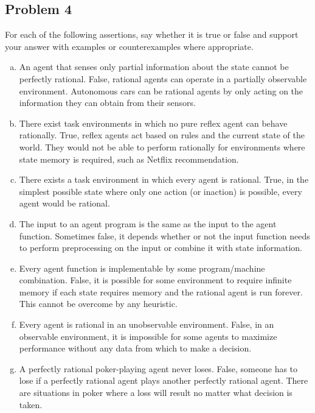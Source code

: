 \documentclass{math}
\begin{document}
\subsection*{Problem 4}
For each of the following assertions, say whether it is true or false and
support your answer with examples or counterexamples where appropriate.
\begin{enumerate}[(a)]
  \item An agent that senses only partial information about the state cannot be
  perfectly rational. False, rational agents can operate in a partially
  observable environment. Autonomous cars can be rational agents by only acting
  on the information they can obtain from their sensors.
  \item There exist task environments in which no pure reflex agent can behave
  rationally. True, reflex agents act based on rules and the current state of
  the world. They would not be able to perform rationally for environments where
  state memory is required, such as Netflix recommendation.
  \item There exists a task environment in which every agent is rational. True,
  in the simplest possible state where only one action (or inaction) is
  possible, every agent would be rational.
  \item The input to an agent program is the same as the input to the agent
  function. Sometimes false, it depends whether or not the input function needs
  to perform preprocessing on the input or combine it with state information.
  \item Every agent function is implementable by some program/machine
  combination. False, it is possible for some environment to require infinite
  memory if each state requires memory and the rational agent is run forever.
  This cannot be overcome by any heuristic.
  \item Every agent is rational in an unobservable environment.
  False, in an observable environment, it is impossible for some agents to
  maximize performance without any data from which to make a decision.
  \item A perfectly rational poker-playing agent never loses. False, someone has
  to lose if a perfectly rational agent plays another perfectly rational agent.
  There are situations in poker where a loss will result no matter what decision
  is taken.
\end{enumerate}
\end{document}
